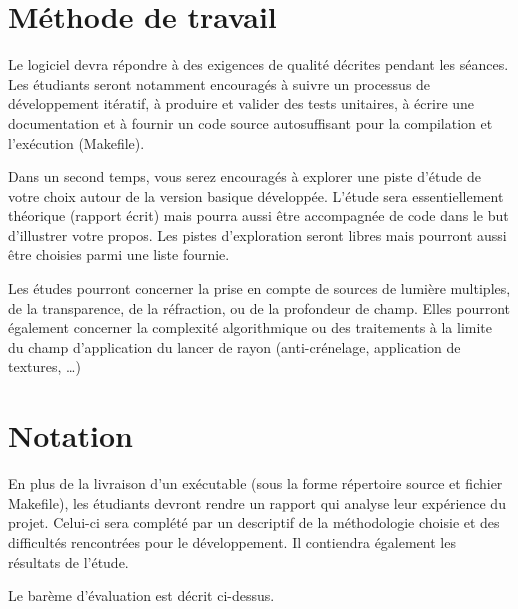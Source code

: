 \documentclass[10pt, a4paper ]{article}
\begin{document}
\section{Méthode de travail}

Le logiciel devra répondre à des exigences de qualité décrites pendant les
séances. Les étudiants seront notamment encouragés à suivre un processus de
développement itératif, à produire et valider des tests unitaires, à écrire une
documentation et à fournir un code source autosuffisant pour la compilation et
l'exécution (Makefile).

Dans un second temps, vous serez encouragés à explorer une piste d'étude de
votre choix autour de la version basique développée. L'étude sera
essentiellement théorique (rapport écrit) mais pourra aussi être accompagnée de
code dans le but d'illustrer votre propos. Les pistes d'exploration seront
libres mais pourront aussi être choisies parmi une liste fournie.

Les études pourront concerner la prise en compte de sources de lumière
multiples, de la transparence, de la réfraction, ou de la profondeur de champ.
Elles pourront également concerner la complexité algorithmique ou des
traitements à la limite du champ d'application du lancer de rayon
(anti-crénelage, application de textures, \ldots)

\section{Notation}

En plus de la livraison d'un exécutable (sous la forme répertoire source et
fichier Makefile), les étudiants devront rendre un rapport qui analyse leur
expérience du projet. Celui-ci sera complété par un descriptif de la
méthodologie choisie et des difficultés rencontrées pour le développement. Il
contiendra également les résultats de l'étude.

Le barème d'évaluation est décrit ci-dessus.
\end{document}
